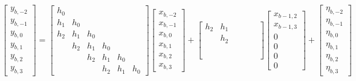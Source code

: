 \begin{equation}\label{eq:MatrixConvCP}
    \begin{bmatrix}
        y_{b,-2}
        \\ y_{b,-1}
        \\ y_{b,0}
        \\ y_{b,1}
        \\ y_{b,2}
        \\ y_{b,3}
    \end{bmatrix}
    =
    \begin{bmatrix}
        h_0 &  &  &  &  & \\ 
        h_1 & h_0 &  &  &  & \\ 
        h_2 & h_1 & h_0 &  &  & \\ 
        & h_2 & h_1 & h_0 &  &  \\ 
        & & h_2 & h_1 & h_0 &  \\ 
        & & & h_2 & h_1 & h_0
    \end{bmatrix}
    \begin{bmatrix}
        x_{b,-2}
        \\ x_{b,-1}
        \\ x_{b,0}
        \\ x_{b,1}
        \\ x_{b,2}
        \\ x_{b,3}
    \end{bmatrix}
    +
    \begin{bmatrix}
        h_2 & h_1 & & & & \\ 
        &  h_2 &  &  &  & \\ 
        &  &  &  &  & \\ 
        &  &  &  &  & \\ 
        &  &  &  &  & \\ 
        &  &  &  &  & 
    \end{bmatrix}
    \begin{bmatrix}
        x_{b-1,2} \\ 
        x_{b-1,3} \\ 
        0 \\
        0 \\ 
        0 \\ 
        0 
    \end{bmatrix}
    +
    \begin{bmatrix}
        \eta_{b,-2}\\ 
        \eta_{b,-1}\\ 
        \eta_{b,0}\\ 
        \eta_{b,1}\\ 
        \eta_{b,2}\\ 
        \eta_{b,3}
    \end{bmatrix}
\end{equation}

